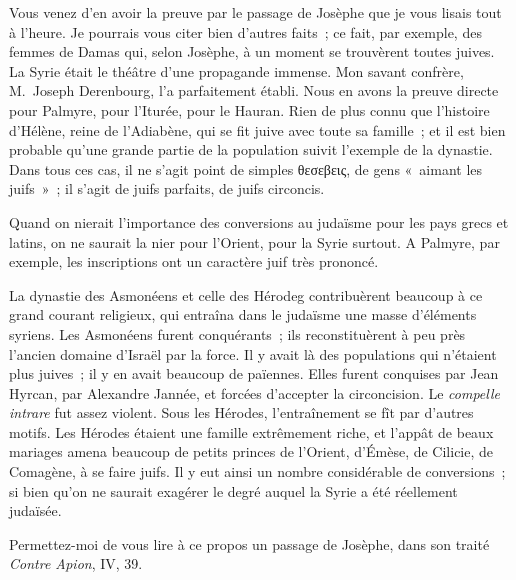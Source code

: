 \documentclass[french,twoside]{book} %
\newcommand\orgName[1]{#1}
\newcommand\persName[1]{#1}
\newcommand\placeName[1]{#1}
\begin{document}
Vous venez d’en avoir la preuve par le passage de {\persName Josèphe} que je vous lisais tout à l’heure. Je pourrais vous citer bien d’autres faits ; ce fait, par exemple, des femmes de {\placeName Damas} qui, selon {\persName Josèphe}, à un moment se trouvèrent toutes juives. La {\placeName Syrie} était le théâtre d’une propagande immense. Mon savant confrère, {\persName M. Joseph Derenbourg}, l’a parfaitement établi. Nous en avons la preuve directe pour {\placeName Palmyre}, pour l’{\placeName Iturée}, pour le {\placeName Hauran}. Rien de plus connu que l’histoire d’{\persName Hélène}, {\persName reine de l’Adiabène}, qui se fit juive avec toute sa famille ; et il est bien probable qu’une grande partie de la population suivit l’exemple de la dynastie. Dans tous ces cas, il ne s’agit point de simples θεσεβεις, de gens « aimant les juifs » ; il s’agit de juifs parfaits, de juifs circoncis.\par
Quand on nierait l’importance des conversions au judaïsme pour les pays grecs et latins, on ne saurait la nier pour l’{\placeName Orient}, pour la {\placeName Syrie} surtout. A {\placeName Palmyre}, par exemple, les inscriptions ont un caractère juif très prononcé.\par
La dynastie des {\orgName Asmonéens} et celle des {\orgName Hérodeg} contribuèrent beaucoup à ce grand courant religieux, qui entraîna dans le judaïsme une masse d’éléments syriens. Les {\orgName Asmonéens} furent conquérants ; ils reconstituèrent à peu près l’ancien domaine d’{\placeName Israël} par la force. Il y avait là des populations qui n’étaient plus juives ; il y en avait beaucoup de païennes. Elles furent conquises par {\persName Jean Hyrcan}, par {\persName Alexandre Jannée}, et forcées d’accepter la circoncision. Le {\itshape compelle intrare} fut assez violent. Sous les {\orgName Hérodes}, l’entraînement se fît par d’autres motifs. Les {\orgName Hérodes} étaient une famille extrêmement riche, et l’appât de beaux mariages amena beaucoup de petits princes de l’{\placeName Orient}, d’{\placeName Émèse}, de {\placeName Cilicie}, de {\placeName Comagène}, à se faire juifs. Il y eut ainsi un nombre considérable de conversions ; si bien qu’on ne saurait exagérer le degré auquel la {\orgName Syrie} a été réellement judaïsée.\par
Permettez-moi de vous lire à ce propos un passage de {\persName Josèphe}, dans son traité {\itshape Contre Apion}, IV, 39.\par
\end{document}
